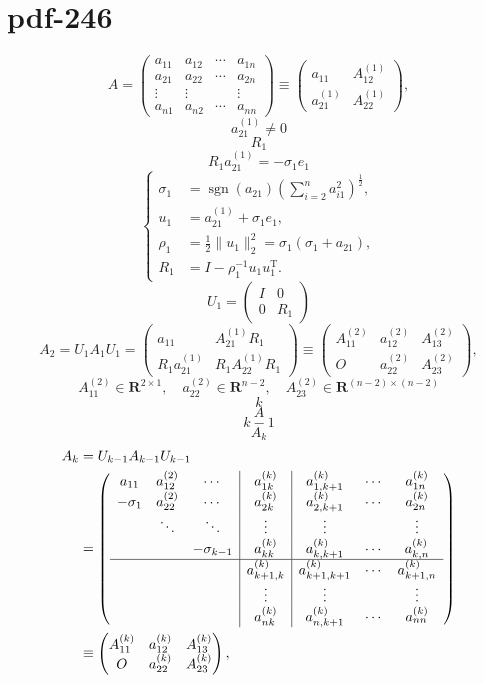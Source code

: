 \documentclass[fontset=fandol]{ctexart}
\begin{document}
\section*{pdf-246}
\[
A=\left(\begin{array}{c|ccc}
a_{11}&a_{12}&\cdots&a_{1n}\\\hline
a_{21}&a_{22}&\cdots&a_{2n}\\
\vdots&\vdots&&\vdots\\
a_{n1}&a_{n2}&\cdots&a_{nn}
\end{array}\right)
\equiv\begin{pmatrix}
a_{11}&A_{12}^{(1)}\\
a_{21}^{(1)}&A_{22}^{(1)}
\end{pmatrix},
\]
\[
a_{21}^{(1)}\ne0
\]
\[
R_1
\]
\[
R_1a_{21}^{(1)}=-\sigma_1e_1
\]
\[
\left\{
\begin{aligned}
\sigma_1&=\operatorname{sgn}(a_{21})\left(\sum_{i=2}^na_{i1}^2\right)^{\frac12},\\
u_1&=a_{21}^{(1)}+\sigma_1e_1,\\
\rho_1&=\frac12\|u_1\|_2^2=\sigma_1(\sigma_1+a_{21}),\\
R_1&=I-\rho_1^{-1}u_1u_1^{\mathrm T}.
\end{aligned}
\right.
\tag{9.3.1}
\]
\[
U_1=\begin{pmatrix}I&0\\0&R_1\end{pmatrix}
\]
\[
A_2=U_1A_1U_1=\begin{pmatrix}
a_{11}&A_{21}^{(1)}R_1\\
R_1a_{21}^{(1)}&R_1A_{22}^{(1)}R_1
\end{pmatrix}
\equiv\begin{pmatrix}
A_{11}^{(2)}&a_{12}^{(2)}&A_{13}^{(2)}\\
O&a_{22}^{(2)}&A_{23}^{(2)}
\end{pmatrix},
\]
\[
A_{11}^{(2)}\in\mathbf R^{2\times1},\quad a_{22}^{(2)}\in\mathbf R^{n-2},\quad A_{23}^{(2)}\in\mathbf R^{(n-2)\times(n-2)}
\]
\[
k
\]
\[
A
\]
\[
k-1
\]
\[
A_k
\]
\[
\begin{aligned}
A_k&=U_{k-1}A_{k-1}U_{k-1}\\
&=\left(\begin{array}{ccc|c|ccc}
a_{11}&a_{12}^{(2)}&\cdots&a_{1k}^{(k)}&a_{1,k+1}^{(k)}&\cdots&a_{1n}^{(k)}\\
-\sigma_1&a_{22}^{(2)}&\cdots&a_{2k}^{(k)}&a_{2,k+1}^{(k)}&\cdots&a_{2n}^{(k)}\\
&\ddots&\ddots&\vdots&\vdots&&\vdots\\
&&-\sigma_{k-1}&a_{kk}^{(k)}&a_{k,k+1}^{(k)}&\cdots&a_{k,n}^{(k)}\\\hline
&&&a_{k+1,k}^{(k)}&a_{k+1,k+1}^{(k)}&\cdots&a_{k+1,n}^{(k)}\\
&&&\vdots&\vdots&&\vdots\\
&&&a_{nk}^{(k)}&a_{n,k+1}^{(k)}&\cdots&a_{nn}^{(k)}
\end{array}\right)\\
&\equiv\begin{pmatrix}
A_{11}^{(k)}&a_{12}^{(k)}&A_{13}^{(k)}\\
O&a_{22}^{(k)}&A_{23}^{(k)}
\end{pmatrix},
\end{aligned}
\]
\end{document}
